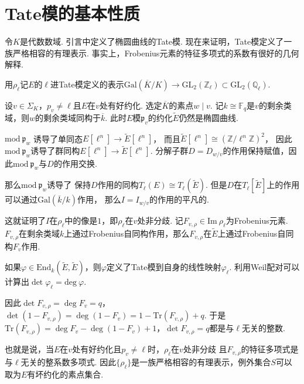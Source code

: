 \section{Tate模的基本性质}

令$K$是代数数域.
引言中定义了椭圆曲线的Tate模.
现在来证明，Tate模定义了一族严格相容的有理表示. 事实上，Frobenius元素的特征多项式的系数有很好的几何解释.

用$\rho_{\ell}$记$E$的$\ell$进Tate模定义的表示$\mathrm{Gal}(\overline{K}/K)\to \mathrm{GL}_2(\mathbb{Z}_{\ell})\subset \mathrm{GL}_2(\mathbb{Q}_{\ell})$.

设$v\in \Sigma_K$，$p_v\neq \ell$且$E$在$v$处有好约化. 选定$\overline{K}$的素点$w\mid v$.
记$k\cong \mathbb{F}_q$是$v$的剩余类域，则$w$的剩余类域同构于$\overline{k}$.
此时$E$模$\mathfrak{p}_v$的约化$\tilde{E}$仍然是椭圆曲线.

$\mathrm{mod}\ \mathfrak{p}_{w}$
诱导了单同态$E[\ell^n]\to \tilde{E}[\ell^n]$，
而且$\tilde{E}[\ell^n]\cong (\mathbb{Z}/\ell^n \mathbb{Z})^2$，
因此$\mathrm{mod}\ \mathfrak{p}_{w}$诱导了群同构$E[\ell^n]\to \tilde{E}[\ell^n]$.
分解子群$D=D_{w/v}$的作用保持赋值，因此$\mathrm{mod}\ \mathfrak{p}_{w}$与$D$的作用交换.

那么$\mathrm{mod}\ \mathfrak{p}_{w}$诱导了
保持$D$作用的同构$T_{\ell}(E)\cong T_{\ell}(\tilde{E})$.
但是$D$在$T_{\ell}[\tilde{E}]$上的作用可以通过$\mathrm{Gal}(\overline{k}/k)$作用，
那么$I=I_{w/v}$的作用的平凡的.

这就证明了$I$在$\rho_{\ell}$中的像是$1$，即$\rho_{\ell}$在$v$处非分歧.
记$F_{v,\rho}\in \mathrm{Im}\ \rho_{\ell}$为Frobenius元素.
$F_{v,\rho}$在剩余类域$k$上通过Frobenius自同构作用，那么$F_{v,\rho}$在$\tilde{E}$上通过Frobenius自同构$F_v$作用.

如果$\varphi\in\mathrm{End}_{k}(\tilde{E}, \tilde{E})$，则$\varphi$定义了Tate模到自身的线性映射$\varphi_{\ell}$.
利用Weil配对可以计算出$\det \varphi_{\ell} = \mathrm{deg}\ \varphi$.
{\parencite[][p. 99]{silverman2009arithmetic}}

因此$\det F_{v,\rho} = \deg F_v = q$，
$\det (1-F_{v,\rho}) = \deg (1-F_v) = 1 - \mathrm{Tr}(F_{v,\rho}) + q$.
于是$\mathrm{Tr}(F_{v,\rho}) = \deg F_v - \deg (1-F_v) + 1$，$\det F_{v,\rho} = q$都是与$\ell$无关的整数.

也就是说，当$E$在$v$处有好约化且$p_v\neq \ell$时，$\rho_{\ell}$在$v$处非分歧
且$F_{v,\rho}$的特征多项式是与$\ell$无关的整系数多项式.
因此$\{\rho_{\ell}\}$是一族严格相容的有理表示，例外集合$S$可以取为$E$有坏约化的素点集合.

